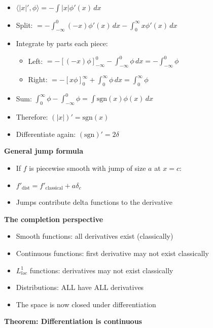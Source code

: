 \documentclass[
  10pt,
  letterpaper,
]{scrbook}
\providecommand{\tightlist}{%
  \setlength{\itemsep}{0pt}\setlength{\parskip}{0pt}}
\begin{document}
\begin{itemize}
\tightlist
\item
  \(\langle |x|', \phi \rangle = -\int |x| \phi'(x)\, dx\)
\item
  Split:
  \(= -\int_{-\infty}^0 (-x)\phi'(x)\, dx - \int_0^\infty x\phi'(x)\, dx\)
\item
  Integrate by parts each piece:

  \begin{itemize}
  \tightlist
  \item
    Left:
    \(= -[(-x)\phi]_{-\infty}^0 - \int_{-\infty}^0 \phi\, dx = -\int_{-\infty}^0 \phi\)
  \item
    Right:
    \(= -[x\phi]_0^\infty + \int_0^\infty \phi\, dx = \int_0^\infty \phi\)
  \end{itemize}
\item
  Sum:
  \(\int_0^\infty \phi - \int_{-\infty}^0 \phi = \int \text{sgn}(x)\phi(x)\, dx\)
\item
  Therefore: \((|x|)' = \text{sgn}(x)\)
\item
  Differentiate again: \((\text{sgn})' = 2\delta\)
\end{itemize}

\textbf{General jump formula}

\begin{itemize}
\tightlist
\item
  If \(f\) is piecewise smooth with jump of size \(a\) at \(x = c\):
\item
  \(f'_{\text{dist}} = f'_{\text{classical}} + a\delta_c\)
\item
  Jumps contribute delta functions to the derivative
\end{itemize}

\textbf{The completion perspective}

\begin{itemize}
\tightlist
\item
  Smooth functions: all derivatives exist (classically)
\item
  Continuous functions: first derivative may not exist classically
\item
  \(L^1_{loc}\) functions: derivatives may not exist classically
\item
  Distributions: ALL have ALL derivatives
\item
  The space is now closed under differentiation
\end{itemize}

\textbf{Theorem: Differentiation is continuous}
\end{document}
